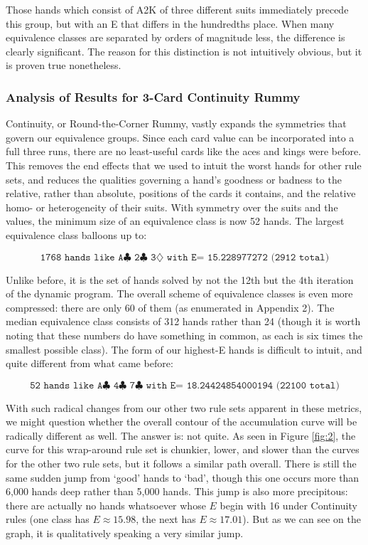 \documentclass[letter,12pt]{article}
\begin{document}
Those hands which consist of A2K of three different suits immediately precede this group, but with an E that differs in the hundredths place. When many equivalence classes are separated by orders of magnitude less, the difference is clearly significant. The reason for this distinction is not intuitively obvious, but it is proven true nonetheless. 

\subsubsection{Analysis of Results for 3-Card Continuity Rummy}

Continuity, or Round-the-Corner Rummy, vastly expands the symmetries that govern our equivalence groups. Since each card value can be incorporated into a full three runs, there are no least-useful cards like the aces and kings were before. This removes the end effects that we used to intuit the worst hands for other rule sets, and reduces the qualities governing a hand’s goodness or badness to the relative, rather than absolute, positions of the cards it contains, and the relative homo- or heterogeneity of their suits. With symmetry over the suits and the values, the minimum size of an equivalence class is now 52 hands. The largest equivalence class balloons up to: 

$$\texttt{1768 hands like A$\clubsuit$ 2$\clubsuit$ 3$\diamondsuit$ with E= 15.228977272 (2912 total)}$$

Unlike before, it is the set of hands solved by not the 12th but the 4th iteration of the dynamic program. The overall scheme of equivalence classes is even more compressed: there are only 60 of them (as enumerated in Appendix 2). The median equivalence class consists of 312 hands rather than 24 (though it is worth noting that these numbers do have something in common, as each is six times the smallest possible class). The form of our highest-E hands is difficult to intuit, and quite different from what came before: 

$$\texttt{52 hands like A$\clubsuit$  4$\clubsuit$  7$\clubsuit$  with E= 18.24424854000194 (22100 total)}$$

With such radical changes from our other two rule sets apparent in these metrics, we might question whether the overall contour of the accumulation curve will be radically different as well. The answer is: not quite. As seen in Figure \ref{fig:2}, the curve for this wrap-around rule set is chunkier, lower, and slower than the curves for the other two rule sets, but it follows a similar path overall. There is still the same sudden jump from ‘good’ hands to ‘bad’, though this one occurs more than 6,000 hands deep rather than 5,000 hands. This jump is also more precipitous: there are  actually no hands whatsoever whose $E$ begin with 16 under Continuity rules (one class has $E \approx 15.98$, the next has $E \approx 17.01$). But as we can see on the graph, it is qualitatively speaking a very similar jump. 
\end{document}
